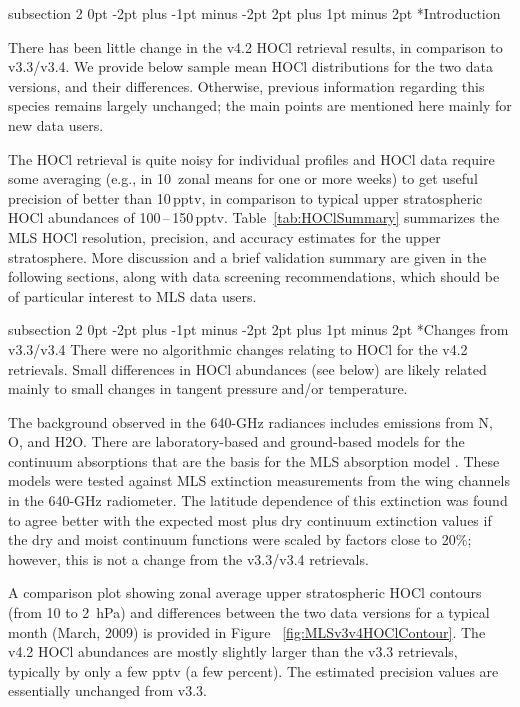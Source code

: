 \documentclass[11pt,draft]{report}
\makeatletter
\renewcommand{\subsection}{\@startsection%
  {subsection}%
  {2}%
  {0pt}%
  {-2pt plus -1pt minus -2pt}%
  {2pt plus 1pt minus 2pt}%
  {\large\sffamily\fontseries{sb}\selectfont\flushleft\color{SectionColor}\figureversion{tabular}}}%
\makeatother
\begin{document}
\subsection*{Introduction}

There has been little change in the v4.2 HOCl retrieval results, in
comparison to v3.3/v3.4. We provide below sample mean HOCl distributions
for the two data versions, and their differences. Otherwise, previous
information regarding this species remains largely unchanged; the main
points are mentioned here mainly for new data users.


The HOCl retrieval is quite noisy for individual profiles and HOCl data
require some averaging (e.g., in 10\degsym\ zonal means for one or more
weeks) to get useful precision of better than 10\,pptv, in comparison to
typical upper stratospheric HOCl abundances of 100\,--\,150\,pptv.
Table~\ref{tab:HOClSummary} summarizes the MLS HOCl resolution,
precision, and accuracy estimates for the upper stratosphere.  More
discussion and a brief validation summary are given in the following
sections, along with data screening recommendations, which should be of
particular interest to MLS data users.

\subsection*{Changes from v3.3/v3.4}
There were no algorithmic changes relating to HOCl for the v4.2
retrievals.  Small differences in HOCl abundances (see below) are likely
related mainly to small changes in tangent pressure and/or temperature.

The background observed in the 640-GHz radiances includes emissions from
N, O, and H\cs2O.  There are laboratory-based and ground-based
models for the continuum absorptions that are the basis for the MLS
absorption model \citep[][and references therein]{PardoEtal01}.  These
models were tested against MLS extinction measurements from the wing
channels in the 640-GHz radiometer.  The latitude dependence of this
extinction was found to agree better with the expected most plus dry
continuum extinction values if the dry and moist continuum functions
were scaled by factors close to 20$\%$; however, this is not a change
from the v3.3/v3.4 retrievals.

A comparison plot showing zonal average upper stratospheric HOCl
contours (from 10 to 2\, hPa) and differences between the two data
versions for a typical month (March, 2009) is provided in Figure
~\ref{fig:MLSv3v4HOClContour}.  The v4.2 HOCl abundances are mostly
slightly larger than the v3.3 retrievals, typically by only a few pptv
(a few percent).  The estimated precision values are essentially
unchanged from v3.3.
\end{document}
